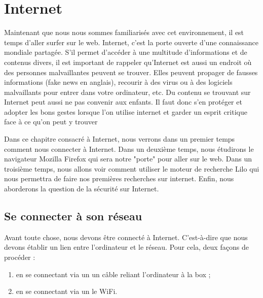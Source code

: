 \documentclass[12pt]{book}
\begin{document}
\chapter{Internet}
Maintenant que nous nous sommes familiarisés avec cet environnement, il est temps d'aller surfer sur le web.
Internet, c'est la porte ouverte d'une connaissance mondiale partagée.
S'il permet d'accéder à une multitude d'informations et de contenus divers, il est important de rappeler qu'Internet est aussi un endroit où des personnes malvaillantes peuvent se trouver.
Elles peuvent propager de fausses informations (fake news en anglais), recourir à des virus ou à des logiciels malvaillants pour entrer dans votre ordinateur, etc.
Du contenu se trouvant sur Internet peut aussi ne pas convenir aux enfants.
Il faut donc s'en protéger et adopter les bons gestes lorsque l'on utilise internet et garder un esprit critique face à ce qu'on peut y trouver\par
Dans ce chapitre consacré à Internet, nous verrons dans un premier temps comment nous connecter à Internet.
Dans un deuxième temps, nous étudirons le navigateur Mozilla Firefox qui sera notre "porte" pour aller sur le web.
Dans un troisième temps, nous allons voir comment utiliser le moteur de recherche Lilo qui nous permettra de faire nos premières recherches sur internet.
Enfin, nous aborderons la question de la sécurité sur Internet.
\section{Se connecter à son réseau}\label{sec:connexion}
	Avant toute chose, nous devons être connecté à Internet. 
	C'est-à-dire que nous devons établir un lien entre l'ordinateur et le réseau.
	Pour cela, deux façons de procéder :
	\begin{enumerate}
		\item en se connectant via un un câble reliant l'ordinateur à la box ;
		\item en se connectant via un le WiFi.
	\end{enumerate}
\end{document}
